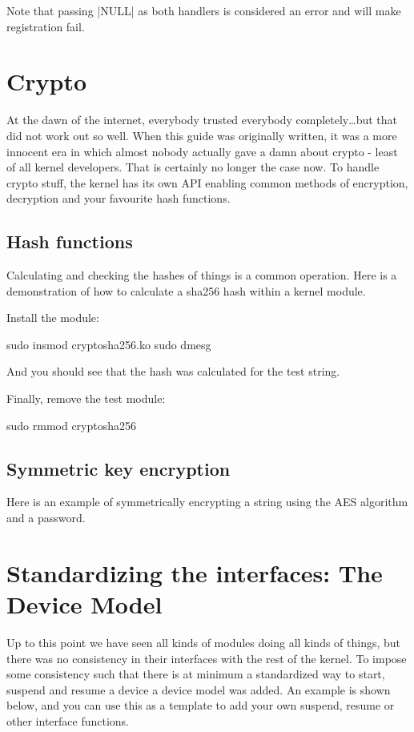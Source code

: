 \documentclass[10pt, oneside]{book}
\begin{document}
Note that passing \cpp|NULL| as both handlers is considered an error and will make registration fail.

\section{Crypto}
\label{sec:crypto}
At the dawn of the internet, everybody trusted everybody completely\ldots{}but that did not work out so well.
When this guide was originally written, it was a more innocent era in which almost nobody actually gave a damn about crypto - least of all kernel developers.
That is certainly no longer the case now.
To handle crypto stuff, the kernel has its own API enabling common methods of encryption, decryption and your favourite hash functions.

\subsection{Hash functions}
\label{sec:hashfunc}

Calculating and checking the hashes of things is a common operation.
Here is a demonstration of how to calculate a sha256 hash within a kernel module.


Install the module:

\begin{codebash}
sudo insmod cryptosha256.ko
sudo dmesg
\end{codebash}

And you should see that the hash was calculated for the test string.

Finally, remove the test module:

\begin{codebash}
sudo rmmod cryptosha256
\end{codebash}

\subsection{Symmetric key encryption}
\label{sec:org2fab20b}
Here is an example of symmetrically encrypting a string using the AES algorithm and a password.


\section{Standardizing the interfaces: The Device Model}
\label{sec:device_model}
Up to this point we have seen all kinds of modules doing all kinds of things, but there was no consistency in their interfaces with the rest of the kernel.
To impose some consistency such that there is at minimum a standardized way to start, suspend and resume a device a device model was added.
An example is shown below, and you can use this as a template to add your own suspend, resume or other interface functions.
\end{document}
